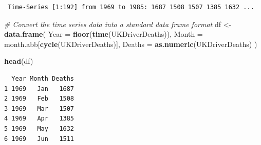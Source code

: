 \documentclass[
  10t,
]{article}
\newenvironment{Shaded}{\begin{snugshade}}{\end{snugshade}}
\newcommand{\AttributeTok}[1]{\textcolor[rgb]{0.13,0.29,0.53}{#1}}
\newcommand{\CommentTok}[1]{\textcolor[rgb]{0.56,0.35,0.01}{\textit{#1}}}
\newcommand{\FunctionTok}[1]{\textcolor[rgb]{0.13,0.29,0.53}{\textbf{#1}}}
\newcommand{\NormalTok}[1]{#1}
\newcommand{\OtherTok}[1]{\textcolor[rgb]{0.56,0.35,0.01}{#1}}
\begin{document}
\begin{verbatim}
 Time-Series [1:192] from 1969 to 1985: 1687 1508 1507 1385 1632 ...
\end{verbatim}

\begin{Shaded}
\begin{Highlighting}[]
\CommentTok{\# Convert the time series data into a standard data frame format}
\NormalTok{df }\OtherTok{\textless{}{-}} \FunctionTok{data.frame}\NormalTok{(}
  \AttributeTok{Year =} \FunctionTok{floor}\NormalTok{(}\FunctionTok{time}\NormalTok{(UKDriverDeaths)),}
  \AttributeTok{Month =}\NormalTok{ month.abb[}\FunctionTok{cycle}\NormalTok{(UKDriverDeaths)], }
  \AttributeTok{Deaths =} \FunctionTok{as.numeric}\NormalTok{(UKDriverDeaths)}
\NormalTok{)}

\FunctionTok{head}\NormalTok{(df)}
\end{Highlighting}
\end{Shaded}

\begin{verbatim}
  Year Month Deaths
1 1969   Jan   1687
2 1969   Feb   1508
3 1969   Mar   1507
4 1969   Apr   1385
5 1969   May   1632
6 1969   Jun   1511
\end{verbatim}
\end{document}
